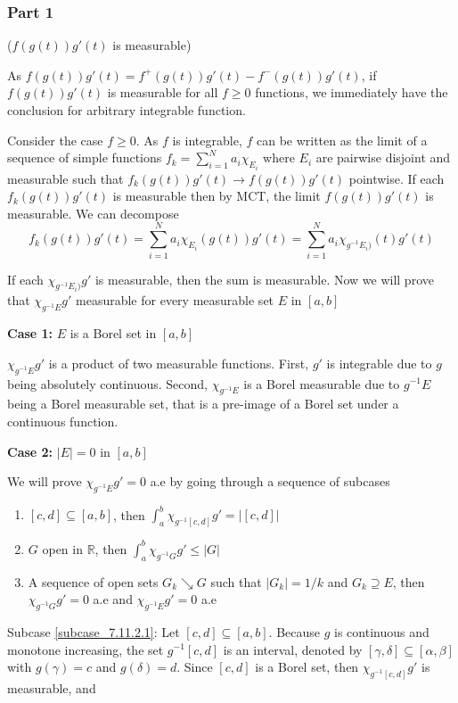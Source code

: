 \documentclass{article}
\newcommand\R{\mathbb{R}}
\begin{document}
\subsubsection{Part 1} ($f(g(t)) g'(t)$ is measurable)

As $f(g(t)) g'(t) = f^+(g(t)) g'(t) - f^-(g(t)) g'(t)$, if $f(g(t)) g'(t)$ is measurable for all $f \geq 0$ functions, we immediately have the conclusion for arbitrary integrable function.

Consider the case $f \geq 0$. As $f$ is integrable, $f$ can be written as the limit of a sequence of simple functions $f_k = \sum_{i=1}^N a_i \chi_{E_i}$ where $E_i$ are pairwise disjoint and measurable such that $f_k(g(t)) g'(t) \to f(g(t)) g'(t)$ pointwise. If each $f_k(g(t)) g'(t)$ is measurable then by MCT, the limit $f(g(t)) g'(t)$ is measurable. We can decompose 
\[
    f_k(g(t)) g'(t) = \sum_{i=1}^N a_i \chi_{E_i}(g(t)) g'(t) = \sum_{i=1}^N a_i \chi_{g^{-1} E_i)}(t) g'(t)
\]

If each $\chi_{g^{-1} E_i)} g'$ is measurable, then the sum is measurable. Now we will prove that $\chi_{g^{-1} E} g'$ measurable for every measurable set $E$ in $[a, b]$

\vspace{0.2cm}\textbf{Case 1:} $E$ is a Borel set in $[a, b]$

$\chi_{g^{-1} E} g'$ is a product of two measurable functions. First, $g'$ is integrable due to $g$ being absolutely continuous. Second, $\chi_{g^{-1} E}$ is a Borel measurable due to $g^{-1} E$ being a Borel measurable set, that is a pre-image of a Borel set under a continuous function.

\vspace{0.2cm}\textbf{Case 2:} $|E| = 0$ in $[a, b]$

We will prove $\chi_{g^{-1} E} g' = 0$ a.e by going through a sequence of subcases
\begin{enumerate}
    \item \label{subcase_7.11.2.1} $[c, d] \subseteq [a, b]$, then $\int_a^b \chi_{g^{-1} [c, d]} g' = |[c, d]|$
    \item \label{subcase_7.11.2.2} $G$ open in $\R$, then $\int_a^b \chi_{g^{-1} G} g' \leq |G|$
    \item \label{subcase_7.11.2.3} A sequence of open sets $G_k \searrow G$ such that $|G_k| = 1/k$ and $G_k \supseteq E$, then $\chi_{g^{-1} G} g' = 0$ a.e and $\chi_{g^{-1} E} g' = 0$ a.e
\end{enumerate}

Subcase \ref{subcase_7.11.2.1}: Let $[c, d] \subseteq [a, b]$. Because $g$ is continuous and monotone increasing, the set $g^{-1}[c, d]$ is an interval, denoted by $[\gamma, \delta] \subseteq [\alpha, \beta]$ with $g(\gamma) = c$ and $g(\delta) = d$. Since $[c, d]$ is a Borel set, then $\chi_{g^{-1}[c, d]} g'$ is measurable, and
\end{document}
